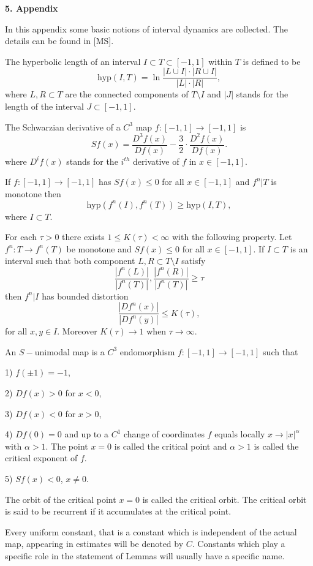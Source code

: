 \bigskip
\centerline{\bf 5. Appendix}
\bigskip

\flushpar
In this appendix some basic notions of interval dynamics are collected. The
details can be found in [MS].

\bigskip

\flushpar
The hyperbolic length of an interval $I\subset T\subset [-1,1]$ within $T$ 
is defined to be
$$
\text{hyp}(I,T)=\ln\frac{|L\cup I|\cdot |R\cup I|}{|L|\cdot |R|},
$$
where $L,R\subset T$ are the connected components of $T\setminus I$ and 
$|J|$ stands for the length of the interval $J\subset [-1,1]$.

\flushpar
The Schwarzian derivative of a $C^3$ map $f:[-1,1]\to [-1,1]$ is
$$
Sf(x)=\frac{D^3f(x)}{Df(x)}-\frac32\cdot\frac{D^2f(x)}{Df(x)}.
$$
where $D^if(x)$ stands for the $i^{th}$ derivative of $f$ in $x\in [-1,1]$.

 If $f:[-1,1]\to [-1,1]$ has $Sf(x)\le 0$ for all
$x\in [-1,1]$ and $f^n|T$ is monotone then
$$
\text{hyp}(f^n(I),f^n(T))\ge \text{hyp}(I,T),
$$
where $I\subset T$.
\endproclaim

 For each $\tau>0$ there exists 
$1\le K(\tau)<\infty$ with the following property. 
Let $f^n:T\to f^n(T)$ be monotone and $Sf(x)\le 0$
for all $x\in [-1,1]$. If $I\subset T$ is an interval such that both component
$L,R\subset T\setminus I$ satisfy
$$
\frac{|f^n(L)|}{|f^n(T)|},\frac{|f^n(R)|}{|f^n(T)|}\ge \tau
$$
then $f^n|I$ has bounded distortion
$$
\frac{|Df^n(x)|}{|Df^n(y)|}\le K(\tau),
$$
for all $x,y\in I$.
Moreover $K(\tau)\to 1$ when $\tau\to \infty$.
\endproclaim

\flushpar
An $S-$unimodal map is a $C^3$ endomorphism $f:[-1,1]\to [-1,1]$ such that

\parindent=15pt
\item{1)} $f(\pm1)=-1$,
\item{2)} $Df(x)>0$ for $x<0$,
\item{3)} $Df(x)<0$ for $x>0$,
\item{4)} $Df(0)=0$ and up to a $C^1$ change of coordinates
$f$ equals locally $x\to |x|^{\alpha}$ with $\alpha>1$. 
The point $x=0$ is called the critical point and $\alpha>1$ is called the
critical exponent of $f$. 
\item{5)} $Sf(x)<0$, $x\ne 0$.

\flushpar
The orbit of the critical point $x=0$ is called the critical orbit. The 
critical orbit is said to be recurrent if it accumulates at the critical 
point.

\bigskip

\flushpar
{} Every uniform constant, that is a constant which
is independent of the actual map, appearing in estimates will be denoted by 
$C$. Constants which play a specific role in the statement of Lemmas will
usually have a specific name.
\enddemo